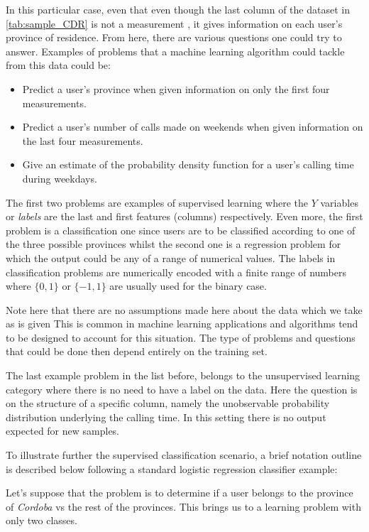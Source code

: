 In this particular case, even that even though the last column of the dataset in \ref{tab:sample_CDR} is not a measurement , it gives information on each user's province of residence. From here, there are various questions one could try to answer. Examples of problems that a machine learning algorithm could tackle from this data could be: 

\begin{itemize}
	\item Predict a user's province when given information on only the first four measurements.
	\item Predict a user's number of calls made on weekends when given information on the last four measurements.
	\item Give an estimate of the probability density function for a user's calling time during weekdays.
\end{itemize}

The first two problems are examples of supervised learning where the $Y$ variables or \textit{labels} are the last and first features (columns) respectively. Even more, the first problem is a classification one since users are to be classified according to one of the three possible provinces whilst the second one is a regression problem for which the output could be any of a range of numerical values. The labels in classification problems are numerically encoded with a finite range of numbers where $\{0,1\}$ or $\{-1,1\}$ are usually used for the binary case.

Note here that there are no assumptions made here about the data which we take as is given %
This is common in machine learning applications and algorithms tend to be designed to account for this situation. The type of problems and questions that could be done then depend entirely on the training set. 

The last example problem in the list before, belongs to the unsupervised learning category where there is no need to have a label on the data. Here the question is on the structure of a specific column, namely the unobservable probability distribution underlying the calling time. In this setting there is no output expected for new samples.

To illustrate further the supervised classification scenario, a brief notation outline is described below following a standard logistic regression classifier example:

Let's suppose that the problem is to determine if a user belongs to the province of \textit{Cordoba} vs the rest of the provinces. This brings us to a learning problem with only two classes. %
 
